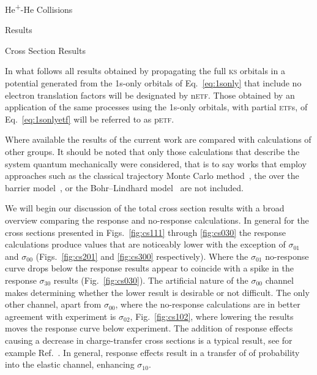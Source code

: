 \documentclass[letterpaper, 11 pt]{report}
\begin{document}
\begin{chapter}{\texorpdfstring{He\textsuperscript{+}}{He+}-He Collisions \label{chap:hephe}}
\begin{section}{Results \label{sec:hephe-disc}}
      \begin{subsection}{Cross Section Results \label{sec:hephe-res}}

         In what follows all results obtained by propagating the full \textsc{ks} orbitals in a
         potential generated from the 1s-only orbitals of Eq.~\eqref{eq:1sonly} that include no electron
         translation factors will be designated by n\textsc{etf}. Those obtained by an application of
         the same processes using the 1s-only orbitals, with partial \textsc{etf}s, of
         Eq.~\eqref{eq:1sonlyetf} will be referred to as p\textsc{etf}.

         Where available the results of the current work are compared with calculations of other groups.
         It should be noted that only those calculations that describe the system quantum mechanically
         were considered, that is to say works that employ approaches such as the classical trajectory
         Monte Carlo method~\cite{GMZ17}, the over the barrier model~\cite{CC-07}, or the Bohr–Lindhard
         model~\cite{DYC-08, DLZ-12} are not included.

         We will begin our discussion of the total cross section results with a broad overview comparing
         the response and no-response calculations. In general for the cross sections presented in
         Figs.~\ref{fig:cs111} through \ref{fig:cs030} the response calculations produce values that are
         noticeably lower with the exception of $\sigma_{01}$ and $\sigma_{00}$ (Figs.~\ref{fig:cs201}
         and \ref{fig:cs300} respectively). Where the $\sigma_{01}$ no-response curve drops below the
         response results appear to coincide with a spike in the response $\sigma_{30}$ results
         (Fig.~\ref{fig:cs030}). The artificial nature of the $\sigma_{00}$ channel makes determining
         whether the lower result is desirable or not difficult. The only other channel, apart from
         $\sigma_{00}$, where the no-response calculations are in better agreement with experiment is
         $\sigma_{02}$, Fig.~\ref{fig:cs102}, where lowering the results moves the response curve below
         experiment. The addition of response effects causing a decrease in charge-transfer cross
         sections is a typical result, see for example Ref.~\cite{microresp}. In general, response
         effects result in a transfer of of probability into the elastic channel, enhancing
         $\sigma_{10}$.


\end{subsection}
\end{section}
\end{chapter}
\end{document}
